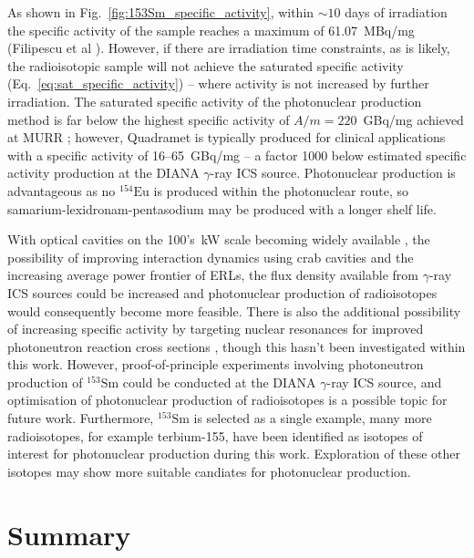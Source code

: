 \documentclass[../main.tex]{subfiles}
\begin{document}
As shown in Fig.~\ref{fig:153Sm_specific_activity}, within $\sim 10$ days of irradiation the specific activity of the sample reaches a maximum of 61.07~\si{\mega\becquerel}/\si{\milli\gram} (Filipescu et al \cite{filipescu2014photoneutron}). However, if there are irradiation time constraints, as is likely, the radioisotopic sample will not achieve the saturated specific activity (Eq.~\ref{eq:sat_specific_activity}) -- where activity is not increased by further irradiation. The saturated specific activity of the photonuclear production method is far below the highest specific activity of $A/m=220$~\si{\giga\becquerel}/\si{\milli\gram} achieved at MURR \cite{ma1996production}; however, Quadramet is typically produced for clinical applications with a specific activity of 16--65~\si{\giga\becquerel}/\si{\milli\gram} \cite{ema2015quadramet} -- a factor 1000 below estimated specific activity production at the DIANA $\gamma$-ray ICS source. Photonuclear production is advantageous as no $^{154}\mathrm{Eu}$ is produced within the photonuclear route, so samarium-lexidronam-pentasodium may be produced with a longer shelf life.
 
With optical cavities on the 100's~\si{\kilo\watt} scale becoming widely available \cite{eggl2016munich,liu2018optical}, the possibility of improving interaction dynamics using crab cavities \cite{variola2011luminosity,koshiba2018luminosity} and the increasing average power frontier of ERLs, the flux density available from $\gamma$-ray ICS sources could be increased and photonuclear production of radioisotopes would consequently become more feasible. There is also the additional possibility of increasing specific activity by targeting nuclear resonances for improved photoneutron reaction cross sections \cite{habs2011production}, though this hasn't been investigated within this work. However, proof-of-principle experiments involving photoneutron production of $^{153}\mathrm{Sm}$ could be conducted at the DIANA $\gamma$-ray ICS source, and optimisation of photonuclear production of radioisotopes is a possible topic for future work. Furthermore, $^{153}\mathrm{Sm}$ is selected as a single example, many more radioisotopes, for example terbium-155, have been identified as isotopes of interest for photonuclear production during this work. Exploration of these other isotopes may show more suitable candiates for photonuclear production.      

\section{Summary}
\end{document}
